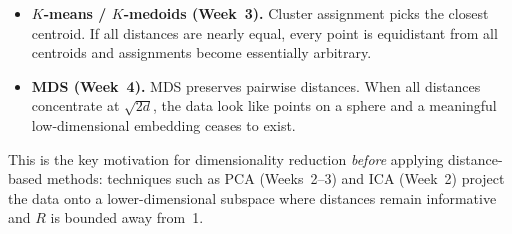 \documentclass[10pt,a4paper]{article}
\begin{document}
\begin{itemize}[noitemsep,topsep=2pt]
  \setlength\itemsep{1pt}
  \item \textbf{$K$-means / $K$-medoids (Week~3).} Cluster assignment picks the closest centroid.
        If all distances are nearly equal, every point is equidistant from all centroids and
        assignments become essentially arbitrary.
  \item \textbf{MDS (Week~4).} MDS preserves pairwise distances. When all distances concentrate
        at $\sqrt{2d}$, the data look like points on a sphere and a meaningful low-dimensional
        embedding ceases to exist.
\end{itemize}

This is the key motivation for dimensionality reduction \emph{before} applying distance-based
methods: techniques such as PCA (Weeks~2--3) and ICA (Week~2) project the data onto a
lower-dimensional subspace where distances remain informative and $R$ is bounded away from~1.
\end{document}
